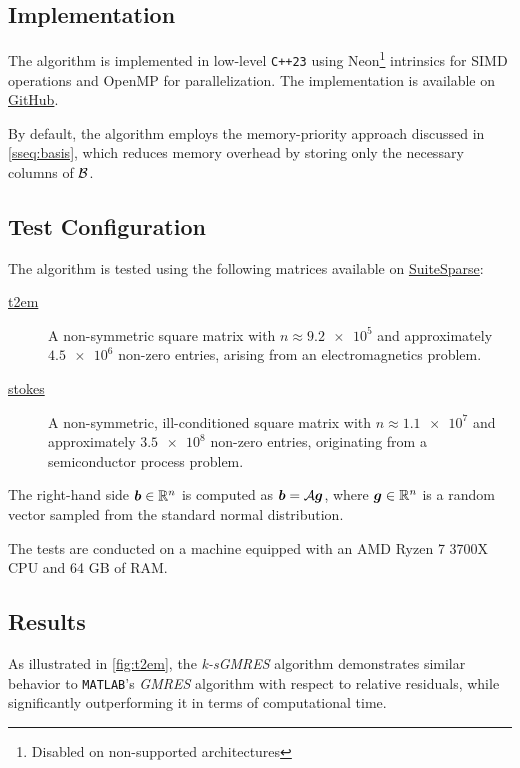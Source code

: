 \subsection{Implementation}

The algorithm is implemented in low-level \lstinline{C++23} using Neon\footnote{Disabled on non-supported architectures} intrinsics for SIMD operations and OpenMP for parallelization. The implementation is available on \href{https://github.com/diantonioandrea/NASS}{GitHub}.

By default, the algorithm employs the memory-priority approach discussed in \cref{sseq:basis}, which reduces memory overhead by storing only the necessary columns of $\mathcal{B}$.

\subsection{Test Configuration}

The algorithm is tested using the following matrices available on \href{https://sparse.tamu.edu}{SuiteSparse}:

\begin{description}
    \item[\href{https://sparse.tamu.edu/CEMW/t2em}{t2em}] A non-symmetric square matrix with $n \approx \num{9.2e5}$ and approximately $\num{4.5e6}$ non-zero entries, arising from an electromagnetics problem.
    \item[\href{https://sparse.tamu.edu/VLSI/stokes}{stokes}] A non-symmetric, ill-conditioned square matrix with $n \approx \num{1.1e7}$ and approximately $\num{3.5e8}$ non-zero entries, originating from a semiconductor process problem.
\end{description}

The right-hand side $\bm{b} \in \mathbb{R}^{n}$ is computed as $\bm{b} = \mathcal{A} \bm{g}$, where $\bm{g} \in \mathbb{R}^{n}$ is a random vector sampled from the standard normal distribution.

The tests are conducted on a machine equipped with an AMD Ryzen 7 3700X CPU and 64 GB of RAM.

\newpage
\subsection{Results}

As illustrated in \cref{fig:t2em}, the \textit{k-sGMRES} algorithm demonstrates similar behavior to \lstinline{MATLAB}'s \textit{GMRES} algorithm with respect to relative residuals, while significantly outperforming it in terms of computational time.

